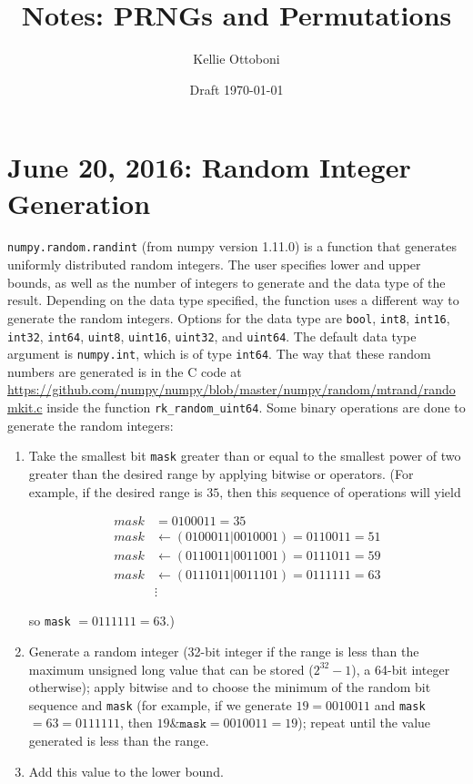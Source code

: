 \documentclass[12pt]{article}
\title{Notes: PRNGs and Permutations}
\author{Kellie Ottoboni}
\date{Draft \today}
\begin{document}
\maketitle





\section{June 20, 2016: Random Integer Generation}
\texttt{numpy.random.randint} (from numpy version 1.11.0) is a function that generates uniformly distributed random integers.
The user specifies lower and upper bounds, as well as the number of integers to generate and the data type of the result.
Depending on the data type specified, the function uses a different way to generate the random integers.
Options for the data type are \texttt{bool}, \texttt{int8}, \texttt{int16}, \texttt{int32}, \texttt{int64}, \texttt{uint8}, \texttt{uint16}, \texttt{uint32}, and \texttt{uint64}.
The default data type argument is \texttt{numpy.int}, which is of type \texttt{int64}.
The way that these random numbers are generated is in the C code at \url{https://github.com/numpy/numpy/blob/master/numpy/random/mtrand/randomkit.c} inside the function \texttt{rk\_random\_uint64}.
Some binary operations are done to generate the random integers:

\begin{enumerate}
\item{ Take the smallest bit \texttt{mask} greater than or equal to the smallest power of two greater than the desired range by applying bitwise or operators. (For example, if the desired range is $35$, then this sequence of operations will yield

\begin{align*}
mask &= 0100011 = 35\\
mask &\leftarrow (0100011 \vert 0010001) = 0110011 = 51 \\
mask &\leftarrow (0110011 \vert 0011001) = 0111011 = 59 \\
mask &\leftarrow (0111011 \vert 0011101) = 0111111 = 63 \\
& \vdots
\end{align*}

so \texttt{mask} $ = 0111111 = 63$.)
}
\item{ Generate a random integer (32-bit integer if the range is less than the maximum unsigned long value that can be stored ($2^{32}-1$), a 64-bit integer otherwise); 
apply bitwise and  to choose the minimum of the random bit sequence and \texttt{mask}
(for example, if we generate $19 = 0010011$ and \texttt{mask} $= 63 = 0111111$, then $19 \& \texttt{mask}  = 0010011 = 19$);
repeat until the value generated is less than the range.
}
\item Add this value to the lower bound.
\end{enumerate}
\end{document}
